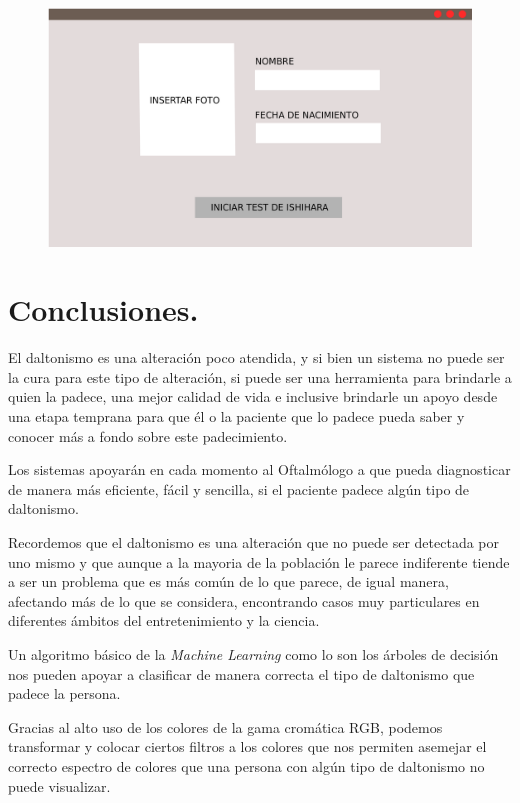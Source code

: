 \documentclass[10pt]{article}
\begin{document}
\begin{figure}[H]
	\begin{center}
\includegraphics[scale = 0.20]{Imagenes/Ventana4.png}
	\end{center} 
\end{figure}


\newpage
\section{Conclusiones.}

El daltonismo es una alteración poco atendida, y si bien un sistema no puede ser la cura para este tipo de alteración, si puede ser una herramienta para brindarle a quien la padece, una mejor calidad de vida e inclusive brindarle un apoyo desde una etapa temprana para que él o la paciente que lo padece pueda saber y conocer más a fondo sobre este padecimiento.

Los sistemas apoyarán en cada momento al Oftalmólogo a que pueda diagnosticar de manera más eficiente, fácil y sencilla, si el paciente padece algún tipo de daltonismo.

Recordemos que el daltonismo es una alteración que no puede ser detectada por uno mismo y que aunque a la mayoria de la población le parece indiferente tiende a ser un problema que es más común de lo que parece, de igual manera, afectando más de lo que se considera, encontrando casos muy particulares en diferentes ámbitos del entretenimiento y la ciencia.

Un algoritmo básico de la \textit{Machine Learning} como lo son los árboles de decisión nos pueden apoyar a clasificar de manera correcta el tipo de daltonismo que padece la persona.

Gracias al alto uso de los colores de la gama cromática RGB, podemos transformar y colocar ciertos filtros a los colores que nos permiten asemejar el correcto espectro de colores que una persona con algún tipo de daltonismo no puede visualizar.
\end{document}
